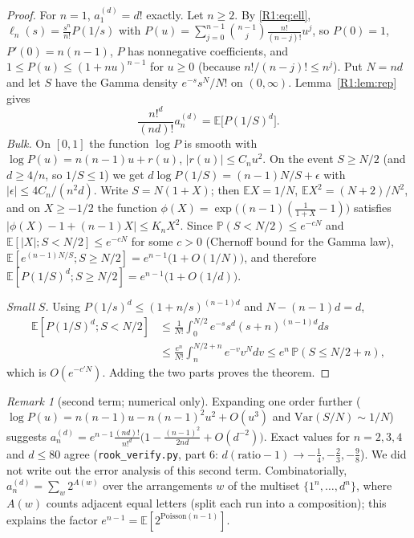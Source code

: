 \documentclass[11pt]{amsart}
\theoremstyle{definition}
\theoremstyle{remark}
\newtheorem{remark}[theorem]{Remark}
\begin{document}
\begin{proof}
For $n=1$, $a^{(d)}_1=d!$ exactly. Let $n\ge2$. By \eqref{R1:eq:ell},
$\ell_n(s)=\frac{s^n}{n!}P(1/s)$ with
$P(u)=\sum_{j=0}^{n-1}\binom{n-1}{j}\frac{n!}{(n-j)!}u^j$, so $P(0)=1$, $P'(0)=n(n-1)$,
$P$ has nonnegative coefficients, and $1\le P(u)\le(1+nu)^{n-1}$ for $u\ge0$ (because
$n!/(n-j)!\le n^j$). Put $N=nd$ and let $S$ have the Gamma density $e^{-s}s^N/N!$ on
$(0,\infty)$. Lemma~\ref{R1:lem:rep} gives
\[
\frac{n!^d}{(nd)!}a^{(d)}_n=\mathbb{E}\bigl[P(1/S)^d\bigr].
\]
\emph{Bulk.} On $[0,1]$ the function $\log P$ is smooth with $\log P(u)=n(n-1)u+r(u)$,
$|r(u)|\le C_nu^2$. On the event $S\ge N/2$ (and $d\ge4/n$, so $1/S\le1$) we get
$d\log P(1/S)=(n-1)N/S+\epsilon$ with $|\epsilon|\le4C_n/(n^2d)$. Write $S=N(1+X)$; then
$\mathbb{E}X=1/N$, $\mathbb{E}X^2=(N+2)/N^2$, and on $X\ge-1/2$ the function
$\phi(X)=\exp\bigl((n-1)(\frac1{1+X}-1)\bigr)$ satisfies $|\phi(X)-1+(n-1)X|\le K_nX^2$.
Since $\mathbb{P}(S<N/2)\le e^{-cN}$ and $\mathbb{E}[|X|;S<N/2]\le e^{-cN}$ for some $c>0$
(Chernoff bound for the Gamma law),
$\mathbb{E}[e^{(n-1)N/S};S\ge N/2]=e^{n-1}\bigl(1+O(1/N)\bigr)$, and therefore
$\mathbb{E}[P(1/S)^d;S\ge N/2]=e^{n-1}\bigl(1+O(1/d)\bigr)$.

\emph{Small $S$.} Using $P(1/s)^d\le(1+n/s)^{(n-1)d}$ and $N-(n-1)d=d$,
\begin{align*}
\mathbb{E}[P(1/S)^d;S<N/2]&\le\frac1{N!}\int_0^{N/2}e^{-s}s^{d}(s+n)^{(n-1)d}ds\\
&\le\frac{e^{n}}{N!}\int_{n}^{N/2+n}e^{-v}v^{N}dv\le e^{n}\,\mathbb{P}(S\le N/2+n),
\end{align*}
which is $O(e^{-c'N})$. Adding the two parts proves the theorem.
\end{proof}

\begin{remark}[second term; numerical only]\label{R1:rem:secondterm}
Expanding one order further ($\log P(u)=n(n-1)u-n(n-1)^2u^2+O(u^3)$ and
$\mathrm{Var}(S/N)\sim1/N$) suggests
$a^{(d)}_n=e^{n-1}\frac{(nd)!}{n!^d}\bigl(1-\frac{(n-1)^2}{2nd}+O(d^{-2})\bigr)$. Exact values
for $n=2,3,4$ and $d\le80$ agree (\texttt{rook\_\allowbreak{}verify.py}, part 6: $d(\text{ratio}-1)\to
-\tfrac14,-\tfrac23,-\tfrac98$). We did not write out the error analysis of this second term.
Combinatorially, $a^{(d)}_n=\sum_w2^{A(w)}$ over the arrangements $w$ of the multiset
$\{1^n,\dots,d^n\}$, where $A(w)$ counts adjacent equal letters (split each run into a
composition); this explains the factor $e^{n-1}=\mathbb{E}[2^{\mathrm{Poisson}(n-1)}]$.
\end{remark}
\end{document}

